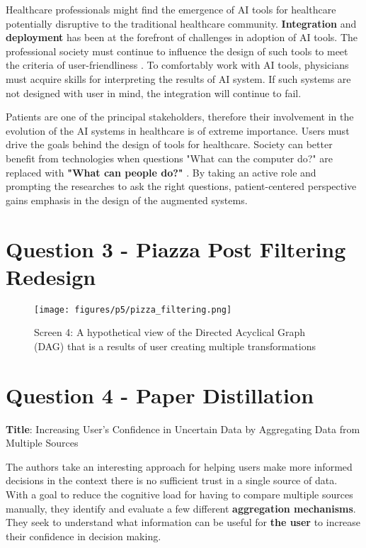\documentclass[12pt,letterpaper]{article}
\begin{document}
Healthcare professionals might find the emergence of AI tools for healthcare potentially disruptive to the traditional healthcare community. \textbf{Integration} and \textbf{deployment} has been at the forefront of challenges in adoption of AI tools. The professional society must continue to influence the design of such tools to meet the criteria of user-friendliness \cite{heathfield1993philosophies}. To comfortably work with AI tools, physicians must acquire skills for interpreting the results of AI system. If such systems are not designed with user in mind, the integration will continue to fail. 

Patients are one of the principal stakeholders, therefore their involvement in the evolution of the AI systems in healthcare is of extreme importance. Users must drive the goals behind the design of tools for healthcare. Society can better benefit from technologies when questions "What can the computer do?" are replaced with \textbf{"What can people do?"} \cite{hesse2007ehealth}. By taking an active role and prompting the researches to ask the right questions, patient-centered perspective gains emphasis in the design of the augmented systems. 

\section*{Question 3 - Piazza Post Filtering Redesign}

\begin{figure}[h]
\centering
\texttt{[image: figures/p5/pizza\_filtering.png]}
\caption{Screen 4: A hypothetical view of the Directed Acyclical Graph (DAG) that is a results of user creating multiple transformations}
\label{fig::5}
\end{figure}

\section*{Question 4 - Paper Distillation}

\textbf{Title}: Increasing User's Confidence in Uncertain Data by Aggregating Data from Multiple Sources \cite{greis2017increasing}

The authors take an interesting approach for helping users make more informed decisions in the context there is no sufficient trust in a single source of data. With a goal to reduce the cognitive load for having to compare multiple sources manually, they identify and evaluate a few different \textbf{aggregation mechanisms}. They seek to understand what information can be useful for \textbf{the user} to increase their confidence in decision making. 
\end{document}
